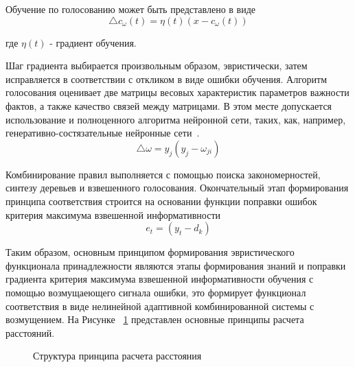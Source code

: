 Обучение по голосованию может быть представлено в виде
\begin{equation}
    \label{eq:equation60}
     \bigtriangleup c_\omega(t) = \eta(t)(x-c_\omega(t))
\end{equation}

где $\eta(t)$ - градиент обучения.

Шаг градиента выбирается произвольным образом, эвристически, затем исправляется в соответствии с откликом в виде ошибки обучения. Алгоритм голосования оценивает две матрицы весовых характеристик параметров важности фактов, а также качество связей между матрицами. В этом месте допускается использование и полноценного алгоритма нейронной сети, таких, как, например, генеративно-состязательные нейронные сети~\cite{Goodfellow}.
\begin{equation}
    \label{eq:equation61}
     \bigtriangleup \omega = y_j(y_j - \omega_{ji})
\end{equation}

Комбинирование правил выполняется с помощью поиска закономерностей, синтезу деревьев и взвешенного голосования. Окончательный этап формирования принципа соответствия строится на основании функции поправки ошибок критерия максимума взвешенной информативности
\begin{equation}
    \label{eq:equation62}
     e_t = (y_t - d_k)
\end{equation}

Таким образом, основным принципом формирования эвристического функционала принадлежности являются этапы формирования знаний и поправки градиента критерия максимума взвешенной информативности обучения с помощью возмущаеющего сигнала ошибки, это формирует функционал соответствия в виде нелинейной адаптивной комбинированной системы с возмущением. 
На Рисунке ~\cref{fig:FLmetrics} представлен основные принципы расчета расстояний. 
\begin{figure}[ht]
    \caption{Структура принципа расчета расстояния}\label{fig:FLmetrics}
\end{figure}

